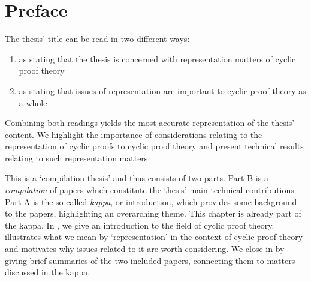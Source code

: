 
\chapter*{Preface}
\label{chap:introduction}


The thesis' title can be read in two different ways:
\begin{enumerate}
\item as stating that the thesis is concerned with representation matters of cyclic
  proof theory
\item as stating that issues of representation are important to cyclic proof theory
  as a whole
\end{enumerate}
Combining both readings yields the most accurate representation of the thesis'
content. We highlight the importance of considerations relating to the
representation of cyclic proofs to cyclic proof theory and present
technical results relating to such representation matters.

This is a `compilation thesis' and thus consists of two parts. Part
\hyperref[p:acrp]{B} is a \emph{compilation} of papers which
constitute the thesis' main technical contributions. Part
\hyperref[chap:introduction]{A} is the so-called \emph{kappa}, or introduction,
which provides some background to the papers, highlighting
an overarching theme. This chapter is already part of the kappa. In
, we give an introduction to the field of cyclic proof
theory.  illustrates what we mean by `representation'
in the context of cyclic proof theory and motivates why issues related to it are
worth considering. We close in  by giving brief summaries of
the two included papers, connecting them to matters discussed in the kappa.



